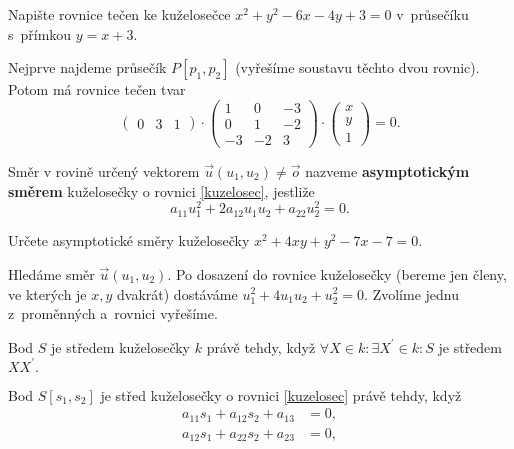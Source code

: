 \begin{priklad}
Napište rovnice tečen ke kuželosečce $x^2+y^2-6x-4y+3=0$ v~průsečíku s~přímkou $y=x+3$.
\end{priklad}

\begin{reseni}
Nejprve najdeme průsečík $P[p_1,p_2]$ (vyřešíme soustavu těchto dvou rovnic).
Potom má rovnice tečen tvar
$$\begin{pmatrix}
    0 & 3 & 1
\end{pmatrix}\cdot \begin{pmatrix}
    1 & 0 & -3\\
    0 & 1 & -2 \\
    -3 & -2 & 3
\end{pmatrix}\cdot \begin{pmatrix}
    x \\
    y \\
    1
\end{pmatrix}=0.$$
\end{reseni}

\begin{definition}
    Směr v rovině určený vektorem $\vec u(u_1, u_2)\ne \vec o$ nazveme
    \textbf{asymptotickým směrem} kuželosečky o rovnici \ref{kuzelosec}, jestliže
    $$a_{11}u_1^2 + 2a_{12}u_1u_2+a_{22}u_2^2=0.$$
\end{definition}

\begin{priklad}
Určete asymptotické směry kuželosečky $x^2+4xy+y^2-7x-7=0.$
\end{priklad}

\begin{reseni}
Hledáme směr $\vec u(u_1,u_2).$ Po dosazení do rovnice kuželosečky (bereme jen
členy, ve kterých je $x,y$ dvakrát) dostáváme $u_1^2+4u_1u_2+u_2^2=0.$ Zvolíme jednu
z~proměnných a~rovnici vyřešíme.
\end{reseni}

\begin{definition}
    Bod $S$ je středem kuželosečky $k$ právě tehdy, když $\forall X\in k:\exists X^\prime\in k: S$ je středem $XX^\prime.$
\end{definition}

\begin{veta}
    Bod $S[s_1,s_2]$ je střed kuželosečky o rovnici \ref{kuzelosec} právě tehdy, když
    \begin{align*}
        a_{11}s_1 + a_{12}s_2+a_{13}&=0,\\
        a_{12}s_1 + a_{22}s_2 + a_{23}&=0,
    \end{align*}
\end{veta}

